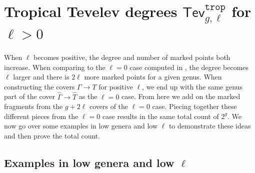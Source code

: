 \documentclass[11pt,reqno]{amsart}
\theoremstyle{definition}
\newcommand\trop{{\mathtt{trop}}}
\newcommand{\gGamma}{\widehat{\Gamma}}
\newcommand{\gT}{\widehat{T}}
\newcommand{\Tev}{{\mathsf{Tev}}}
\begin{document}
\section{Tropical Tevelev degrees $\Tev^\trop_{g,\ell}$ for $\ell>0$}
\label{sec:ell>0}

When $\ell$ becomes positive, the degree and number of marked points both increase. When comparing to the $\ell=0$ case computed in \cite{troptev}, the degree becomes $\ell$ larger and there is $2\ell$ more marked points for a given genus. When constructing the covers $\Gamma \to T$ for positive $\ell$, we end up with the same genus part of the cover $\gGamma \to \gT$ as the $\ell = 0$ case. From here we add on the marked fragments from the $g+2\ell$ covers of the $\ell=0$ case. Piecing together these different pieces from the $\ell=0$ case results in the same total count of $2^g$. We now go over some examples in low genera and low $\ell$ to demonstrate these ideas and then prove the total count.
\newpage
\subsection{Examples in low genera and low $\ell$}
\end{document}
